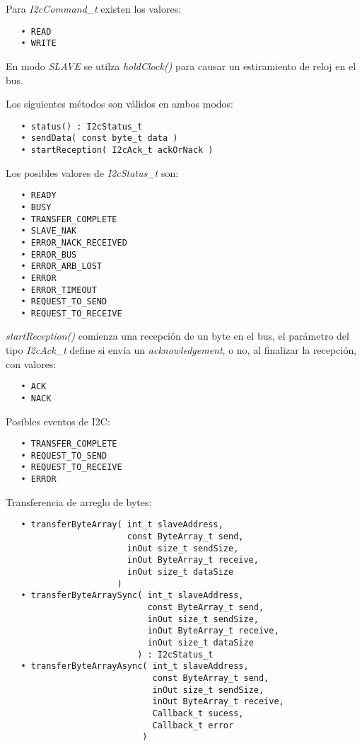 Para \emph{I2cCommand\_t} existen los valores:

\begin{verbatim}
   • READ
   • WRITE
\end{verbatim}

En modo \emph{SLAVE} se utilza \emph{holdClock()} para causar un estiramiento de reloj en el bus.

Los siguientes métodos son válidos en ambos modos:

\begin{verbatim}
   • status() : I2cStatus_t
   • sendData( const byte_t data )
   • startReception( I2cAck_t ackOrNack )
\end{verbatim}

Los posibles valores de \emph{I2cStatus\_t} son:

\begin{verbatim}
   • READY
   • BUSY
   • TRANSFER_COMPLETE
   • SLAVE_NAK 
   • ERROR_NACK_RECEIVED
   • ERROR_BUS
   • ERROR_ARB_LOST
   • ERROR
   • ERROR_TIMEOUT
   • REQUEST_TO_SEND
   • REQUEST_TO_RECEIVE
\end{verbatim}

\emph{startReception()} comienza una recepción de un byte en el bus, el parámetro del tipo \emph{I2cAck\_t} define si envía un \emph{acknowledgement}, o no, al finalizar la recepción, con valores:

\begin{verbatim}
   • ACK
   • NACK
\end{verbatim}

Posibles eventos de I2C:

\begin{verbatim}
   • TRANSFER_COMPLETE
   • REQUEST_TO_SEND
   • REQUEST_TO_RECEIVE
   • ERROR
\end{verbatim}


Transferencia de arreglo de bytes:

\begin{verbatim}
   • transferByteArray( int_t slaveAddress,
                        const ByteArray_t send,
                        inOut size_t sendSize,
                        inOut ByteArray_t receive,
                        inOut size_t dataSize
                      )
   • transferByteArraySync( int_t slaveAddress,
                            const ByteArray_t send,
                            inOut size_t sendSize,
                            inOut ByteArray_t receive,
                            inOut size_t dataSize
                          ) : I2cStatus_t
   • transferByteArrayAsync( int_t slaveAddress,
                             const ByteArray_t send,
                             inOut size_t sendSize,
                             inOut ByteArray_t receive,
                             Callback_t sucess,
                             Callback_t error 
                           )
\end{verbatim}
